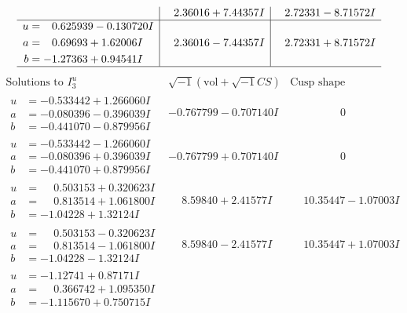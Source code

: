 \documentclass[1p]{elsarticle_modified}
\theoremstyle{definition}
\newcommand{\I}{\sqrt{-1}}
\begin{document}
$$\begin{array}{c|c|c}
 & \phantom{-}2.36016 + 7.44357 I & \phantom{-}2.72331 - 8.71572 I \\ \hline\begin{aligned}
u &= \phantom{-}0.625939 - 0.130720 I \\
a &= \phantom{-}0.69693 + 1.62006 I \\
b &= -1.27363 + 0.94541 I\end{aligned}
 & \phantom{-}2.36016 - 7.44357 I & \phantom{-}2.72331 + 8.71572 I\\
 \hline 
 \end{array}$$\newpage$$\begin{array}{c|c|c}  
\text{Solutions to }I^u_{3}& \I (\text{vol} + \sqrt{-1}CS) & \text{Cusp shape}\\
 \hline 
\begin{aligned}
u &= -0.533442 + 1.266060 I \\
a &= -0.080396 - 0.396039 I \\
b &= -0.441070 - 0.879956 I\end{aligned}
 & -0.767799 - 0.707140 I & \phantom{-0.000000 } 0 \\ \hline\begin{aligned}
u &= -0.533442 - 1.266060 I \\
a &= -0.080396 + 0.396039 I \\
b &= -0.441070 + 0.879956 I\end{aligned}
 & -0.767799 + 0.707140 I & \phantom{-0.000000 } 0 \\ \hline\begin{aligned}
u &= \phantom{-}0.503153 + 0.320623 I \\
a &= \phantom{-}0.813514 + 1.061800 I \\
b &= -1.04228 + 1.32124 I\end{aligned}
 & \phantom{-}8.59840 + 2.41577 I & \phantom{-}10.35447 - 1.07003 I \\ \hline\begin{aligned}
u &= \phantom{-}0.503153 - 0.320623 I \\
a &= \phantom{-}0.813514 - 1.061800 I \\
b &= -1.04228 - 1.32124 I\end{aligned}
 & \phantom{-}8.59840 - 2.41577 I & \phantom{-}10.35447 + 1.07003 I \\ \hline\begin{aligned}
u &= -1.12741 + 0.87171 I \\
a &= \phantom{-}0.366742 + 1.095350 I \\
b &= -1.115670 + 0.750715 I\end{aligned}

\end{array}$$
\end{document}
